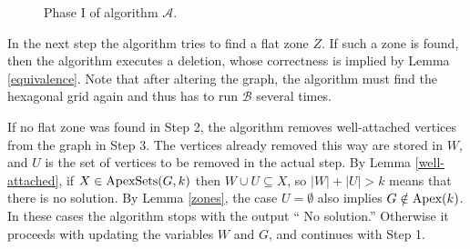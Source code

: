 \documentclass{llncs}
\begin{document}
\begin{figure}
\begin{center}
\end{center}
\caption{Phase I of algorithm $\mathcal{A}$.}
\label{alg_phase_I}
\end{figure}

In the next step the algorithm tries to find a flat zone $Z$.
If such a zone is found, then
the algorithm executes a deletion, whose correctness is implied by
Lemma \ref{equivalence}. Note that after altering the graph,
the algorithm must find the hexagonal grid again and thus has to run $\mathcal{B}$ several times.

If no flat zone was found in Step 2, the algorithm removes well-attached
vertices from the graph in Step 3.
The vertices already removed this way are stored in $W$, and $U$ is
the set of vertices to be removed in the actual step.
By Lemma \ref{well-attached}, if $X \in \textup{ApexSets}(G,k)$ then
$W \cup U \subseteq X$, so $|W|+|U|>k$ means that there is no solution.
By Lemma  \ref{zones}, the case $U = \emptyset$ also implies $G \notin \textup{Apex}(k)$.
In these cases the algorithm stops with the output `` No solution.''
Otherwise it proceeds with updating the variables $W$ and $G$, and continues with Step 1.
\end{document}
